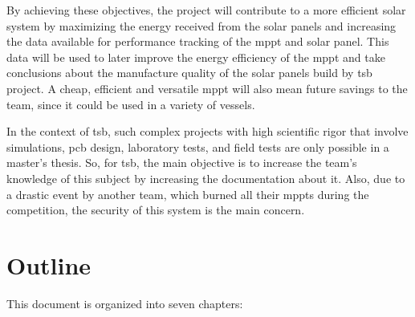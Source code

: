 By achieving these objectives, the project will contribute to a more efficient solar system by maximizing the energy received from the solar panels and increasing the data available for performance tracking of the \ac{mppt} and solar panel. This data will be used to later improve the energy efficiency of the \ac{mppt} and take conclusions about the manufacture quality of the solar panels build by \ac{tsb} project. A cheap, efficient and versatile \ac{mppt} will also mean future savings to the team, since it could be used in a variety of vessels.

In the context of \ac{tsb}, such complex projects with high scientific rigor that involve simulations, \ac{pcb} design, laboratory tests, and field tests are only possible in a master's thesis. So, for \ac{tsb}, the main objective is to increase the team's knowledge of this subject by increasing the documentation about it. Also, due to a drastic event by another team, which burned all their \acp{mppt} during the competition, the security of this system is the main concern.



\section{Outline}

This document is organized into seven chapters:

